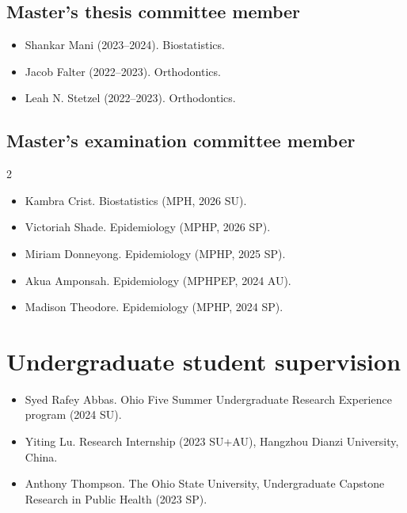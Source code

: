 \documentclass[
  10pt,
  letterpaper,
]{article}
\providecommand{\tightlist}{%
  \setlength{\itemsep}{0pt}\setlength{\parskip}{0pt}}
\begin{document}
\subsection{Master's thesis committee
member}\label{masters-thesis-committee-member}

\begin{itemize}
\tightlist
\item
  Shankar Mani (2023--2024). Biostatistics.
\item
  Jacob Falter (2022--2023). Orthodontics.
\item
  Leah N. Stetzel (2022--2023). Orthodontics.
\end{itemize}

\subsection{Master's examination committee
member}\label{masters-examination-committee-member}

\begin{multicols}{2}\raggedright

\begin{itemize}
\tightlist
\item
  Kambra Crist. Biostatistics (MPH, 2026 SU).
\item
  Victoriah Shade. Epidemiology (MPHP, 2026 SP).
\item
  Miriam Donneyong. Epidemiology (MPHP, 2025 SP).
\item
  Akua Amponsah. Epidemiology (MPHPEP, 2024 AU).
\item
  Madison Theodore. Epidemiology (MPHP, 2024 SP).
\end{itemize}

\end{multicols}

\section{Undergraduate student
supervision}\label{undergraduate-student-supervision}

\begin{itemize}
\tightlist
\item
  Syed Rafey Abbas. Ohio Five Summer Undergraduate Research Experience
  program (2024 SU).
\item
  Yiting Lu. Research Internship (2023 SU+AU), Hangzhou Dianzi
  University, China.
\item
  Anthony Thompson. The Ohio State University, Undergraduate Capstone
  Research in Public Health (2023 SP).
\end{itemize}
\end{document}
